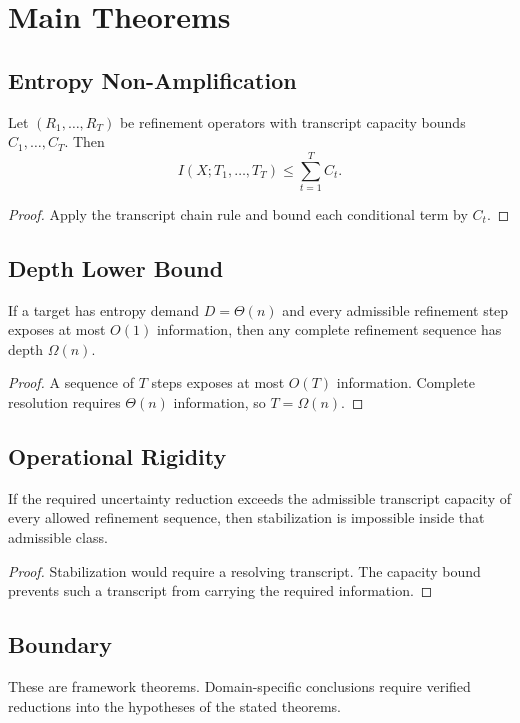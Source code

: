 \chapter{Main Theorems}

\section{Entropy Non-Amplification}

\begin{theorem}
Let \((R_1,\ldots,R_T)\) be refinement operators with transcript capacity bounds \(C_1,\ldots,C_T\).  Then
\[
I(X;T_1,\ldots,T_T) \le \sum_{t=1}^{T} C_t .
\]
\end{theorem}

\begin{proof}
Apply the transcript chain rule and bound each conditional term by \(C_t\).
\end{proof}

\section{Depth Lower Bound}

\begin{theorem}
If a target has entropy demand \(D=\Theta(n)\) and every admissible refinement step exposes at most \(O(1)\) information, then any complete refinement sequence has depth \(\Omega(n)\).
\end{theorem}

\begin{proof}
A sequence of \(T\) steps exposes at most \(O(T)\) information.  Complete resolution requires \(\Theta(n)\) information, so \(T=\Omega(n)\).
\end{proof}

\section{Operational Rigidity}

\begin{theorem}
If the required uncertainty reduction exceeds the admissible transcript capacity of every allowed refinement sequence, then stabilization is impossible inside that admissible class.
\end{theorem}

\begin{proof}
Stabilization would require a resolving transcript.  The capacity bound prevents such a transcript from carrying the required information.
\end{proof}

\section{Boundary}

These are framework theorems.  Domain-specific conclusions require verified reductions into the hypotheses of the stated theorems.
